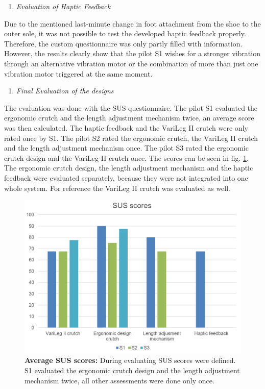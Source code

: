 \documentclass[conference,a4paper]{IEEEtran}
\begin{document}
\begin{enumerate}[\textit{1)}]
    \item{\textit{Evaluation of Haptic Feedback}}
\end{enumerate}

Due to the mentioned last-minute change in foot attachment from the shoe to the outer sole, it was not possible to test the developed haptic feedback properly. Therefore, the custom questionnaire was only partly filled with information. However, the results clearly show that the pilot S1 wishes for a stronger vibration through an alternative vibration motor or the combination of more than just one vibration motor triggered at the same moment.  \\
\begin{enumerate}[\textit{2)}]
    \item{\textit{Final Evaluation of the designs}}
\end{enumerate}
The evaluation was done with the SUS questionnaire.
The pilot S1 evaluated the ergonomic crutch and the length adjustment mechanism twice, an average score was then calculated. The haptic feedback and the VariLeg II crutch were only rated once by S1. The pilot S2 rated the ergonomic crutch, the VariLeg II crutch and the length adjustment mechanism once. The pilot S3 rated the ergonomic crutch design and the VariLeg II crutch once. The scores can be seen in fig. \ref{fig:SUS scores}.\\
The ergonomic crutch design, the length adjustment mechanism and the haptic feedback were evaluated separately, because they were not integrated into one whole system. For reference the VariLeg II crutch was evaluated as well. \\

\begin{figure}
    \centering
    \includegraphics[width=1.0\columnwidth]{Images/Discussion/SUS_balkendiagramm.PNG}
    \caption{\textbf{Average SUS scores:} During evaluating SUS scores were defined. S1 evaluated the ergonomic crutch design and the length adjustment mechanism twice, all other assessments were done only once.}
    \label{fig:SUS scores}
\end{figure}
\end{document}
